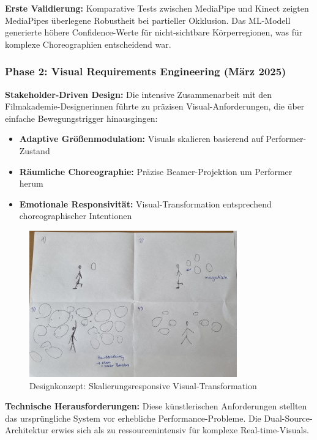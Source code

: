 \textbf{Erste Validierung:}
Komparative Tests zwischen MediaPipe und Kinect zeigten MediaPipes überlegene Robustheit bei partieller Okklusion. Das ML-Modell generierte höhere Confidence-Werte für nicht-sichtbare Körperregionen, was für komplexe Choreographien entscheidend war.

\subsubsection{Phase 2: Visual Requirements Engineering (März 2025)}

\textbf{Stakeholder-Driven Design:}
Die intensive Zusammenarbeit mit den Filmakademie-Designerinnen führte zu präzisen Visual-Anforderungen, die über einfache Bewegungstrigger hinausgingen:

\begin{itemize}
    \item \textbf{Adaptive Größenmodulation:} Visuals skalieren basierend auf Performer-Zustand
    \item \textbf{Räumliche Choreographie:} Präzise Beamer-Projektion um Performer herum
    \item \textbf{Emotionale Responsivität:} Visual-Transformation entsprechend choreographischer Intentionen
\end{itemize}

\begin{figure}[H]
    \centering
    \includegraphics[width=0.8\textwidth]{images/Sprint3_1.jpg}
    \caption{Designkonzept: Skalierungsresponsive Visual-Transformation}
    \label{fig:design_evolution}
\end{figure}

\textbf{Technische Herausforderungen:}
Diese künstlerischen Anforderungen stellten das ursprüngliche System vor erhebliche Performance-Probleme. Die Dual-Source-Architektur erwies sich als zu ressourcenintensiv für komplexe Real-time-Visuals.

